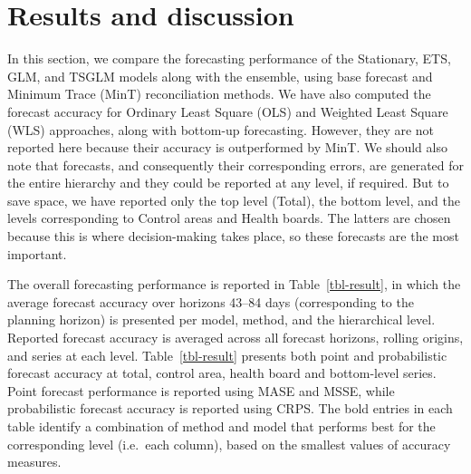 \documentclass[
  authoryear,
  preprint,
  3p]{elsarticle}
\begin{document}
\hypertarget{sec-results}{%
\section{Results and discussion}\label{sec-results}}

In this section, we compare the forecasting performance of the
Stationary, ETS, GLM, and TSGLM models along with the ensemble, using
base forecast and Minimum Trace (MinT) reconciliation methods. We have
also computed the forecast accuracy for Ordinary Least Square (OLS) and
Weighted Least Square (WLS) approaches, along with bottom-up
forecasting. However, they are not reported here because their accuracy
is outperformed by MinT. We should also note that forecasts, and
consequently their corresponding errors, are generated for the entire
hierarchy and they could be reported at any level, if required. But to
save space, we have reported only the top level (Total), the bottom
level, and the levels corresponding to Control areas and Health boards.
The latters are chosen because this is where decision-making takes
place, so these forecasts are the most important.

The overall forecasting performance is reported in
Table~\ref{tbl-result}, in which the average forecast accuracy over
horizons 43--84 days (corresponding to the planning horizon) is
presented per model, method, and the hierarchical level. Reported
forecast accuracy is averaged across all forecast horizons, rolling
origins, and series at each level. Table~\ref{tbl-result} presents both
point and probabilistic forecast accuracy at total, control area, health
board and bottom-level series. Point forecast performance is reported
using MASE and MSSE, while probabilistic forecast accuracy is reported
using CRPS. The bold entries in each table identify a combination of
method and model that performs best for the corresponding level
(i.e.~each column), based on the smallest values of accuracy measures.
\end{document}
